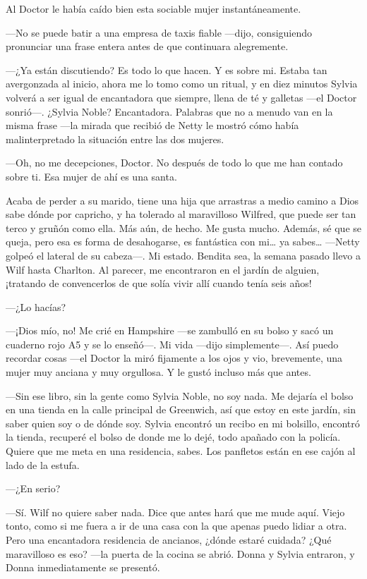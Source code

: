 Al Doctor le había caído bien esta sociable mujer instantáneamente.

---No se puede batir a una empresa de taxis fiable ---dijo, consiguiendo
pronunciar una frase entera antes de que continuara alegremente.

---¿Ya están discutiendo? Es todo lo que hacen. Y es sobre mi. Estaba
tan avergonzada al inicio, ahora me lo tomo como un ritual, y en diez
minutos Sylvia volverá a ser igual de encantadora que siempre, llena de
té y galletas ---el Doctor sonrió---. ¿Sylvia Noble? Encantadora.
Palabras que no a menudo van en la misma frase ---la mirada que recibió
de Netty le mostró cómo había malinterpretado la situación entre las dos
mujeres.

---Oh, no me decepciones, Doctor. No después de todo lo que me han
contado sobre ti. Esa mujer de ahí es una santa.

Acaba de perder a su marido, tiene una hija que arrastras a medio camino
a Dios sabe dónde por capricho, y ha tolerado al maravilloso Wilfred,
que puede ser tan terco y gruñón como ella. Más aún, de hecho. Me gusta
mucho. Además, sé que se queja, pero esa es forma de desahogarse, es
fantástica con mi\ldots{} ya sabes\ldots{} ---Netty golpeó el lateral de
su cabeza---. Mi estado. Bendita sea, la semana pasado llevo a Wilf
hasta Charlton. Al parecer, me encontraron en el jardín de alguien,
¡tratando de convencerlos de que solía vivir allí cuando tenía seis
años!

---¿Lo hacías?

---¡Dios mío, no! Me crié en Hampshire ---se zambulló en su bolso y
sacó un cuaderno rojo A5 y se lo enseñó---. Mi vida ---dijo
simplemente---. Así puedo recordar cosas ---el Doctor la miró fijamente
a los ojos y vio, brevemente, una mujer muy anciana y muy orgullosa. Y
le gustó incluso más que antes.

---Sin ese libro, sin la gente como Sylvia Noble, no soy nada. Me
dejaría el bolso en una tienda en la calle principal de Greenwich, así
que estoy en este jardín, sin saber quien soy o de dónde soy. Sylvia
encontró un recibo en mi bolsillo, encontró la tienda, recuperé el bolso
de donde me lo dejé, todo apañado con la policía. Quiere que me meta en
una residencia, sabes. Los panfletos están en ese cajón al lado de la
estufa.

---¿En serio?

---Sí. Wilf no quiere saber nada. Dice que antes hará que me mude aquí.
Viejo tonto, como si me fuera a ir de una casa con la que apenas puedo
lidiar a otra. Pero una encantadora residencia de ancianos, ¿dónde
estaré cuidada? ¿Qué maravilloso es eso? ---la puerta de la cocina se
abrió. Donna y Sylvia entraron, y Donna inmediatamente se presentó.

